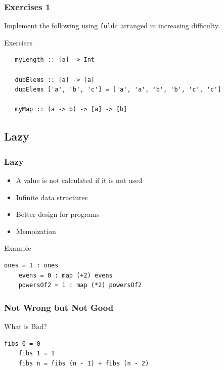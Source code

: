 \documentclass{beamer}
\begin{document}
\begin{frame}[fragile]
\frametitle{Exercises 1}

Implement the following using \texttt{foldr} arranged in increasing difficulty.

 \vspace{0.5cm}
 \begin{block}{Exercises}

  \begin{lstlisting}
   myLength :: [a] -> Int

   dupElems :: [a] -> [a]
   dupElems ['a', 'b', 'c'] = ['a', 'a', 'b', 'b', 'c', 'c']

   myMap :: (a -> b) -> [a] -> [b]
  \end{lstlisting}

 \end{block}

\end{frame}

\subsection{Lazy}
\begin{frame}[fragile]
\frametitle{Lazy}

\begin{itemize}
\item A value is not calculated if it is not used
\item Infinite data structures
\item Better design for programs
\item Memoization
\end{itemize}
\vspace{0.5cm}
\begin{block}{Example}
  \begin{lstlisting}[basicstyle=\small]
    ones = 1 : ones
    evens = 0 : map (+2) evens
    powersOf2 = 1 : map (*2) powersOf2
  \end{lstlisting}
\end{block}

\end{frame}

\begin{frame}[fragile]
\frametitle{Not Wrong but Not Good}

\vspace{0.1cm}
\begin{block}{What is Bad?}
  \begin{lstlisting}[basicstyle=\small]
    fibs 0 = 0
    fibs 1 = 1
    fibs n = fibs (n - 1) + fibs (n - 2)
  \end{lstlisting}
\end{block}

\end{frame}
\end{document}

